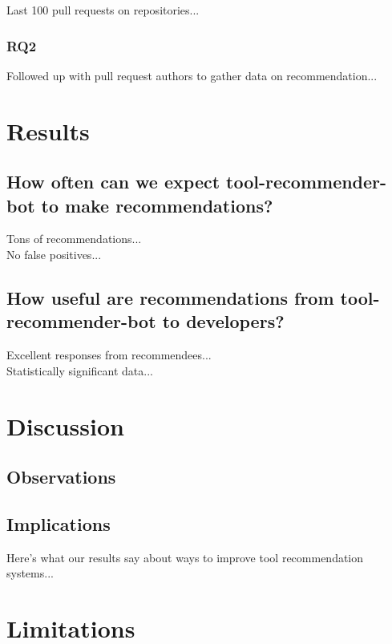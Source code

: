 \documentclass[conference]{IEEEtran}
\newcommand{\tool}{tool-recommender-bot }
\begin{document}
Last 100 pull requests on repositories...

\subsubsection{RQ2}

Followed up with pull request authors to gather data on recommendation...

\section{Results}

\subsection{How often can we expect \tool to make recommendations?}

Tons of recommendations... \\

No false positives... \\

\subsection{How useful are recommendations from \tool to developers?}

Excellent responses from recommendees...\\

Statistically significant data...

\section{Discussion}

\subsection{Observations}

\subsection{Implications}

Here's what our results say about ways to improve tool recommendation systems...

\section{Limitations}
\end{document}
